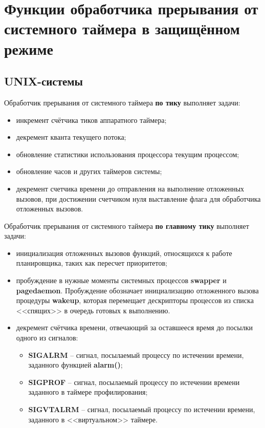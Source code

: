 \chapter{Функции обработчика прерывания от системного таймера в защищённом режиме}

\section{UNIX-системы}

Обработчик прерывания от системного таймера \textbf{по тику} выполняет задачи:

\begin{itemize}
    \item инкремент счётчика тиков аппаратного таймера;
    \item декремент кванта текущего потока;
    \item обновление статистики использования процессора текущим процессом;
    \item обновление часов и других таймеров системы;
    \item декремент счетчика времени до отправления на выполнение отложенных вызовов, при достижении счетчиком нуля выставление флага для обработчика отложенных вызовов.
\end{itemize}

Обработчик прерывания от системного таймера \textbf{по главному тику} выполняет задачи:

\begin{itemize}
    \item инициализация отложенных вызовов функций, относящихся к работе планировщика, таких как пересчет приоритетов;
    \item пробуждение в нужные моменты системных процессов \textbf{swapper} и \textbf{pagedaemon}. Пробуждение обозначает инициализацию отложенного вызова процедуры \textbf{wakeup}, которая перемещает дескрипторы процессов из списка <<спящих>> в очередь готовых к выполнению.
    \item декремент счётчика времени, отвечающий за оставшееся время до посылки одного из сигналов:
        \begin{itemize}
            \item \textbf{SIGALRM} -- сигнал, посылаемый процессу по истечении времени, заданного функцией \textbf{alarm()};
            \item \textbf{SIGPROF} -- сигнал, посылаемый процессу по истечении времени заданного в таймере профилирования;
            \item \textbf{SIGVTALRM} --  сигнал, посылаемый процессу по истечении времени, заданного в <<виртуальном>> таймере.
        \end{itemize}
\end{itemize}

